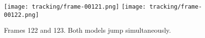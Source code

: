 \begin{figure}[p]
  \centering
  \texttt{[image: tracking/frame-00121.png]}
  \texttt{[image: tracking/frame-00122.png]}
  \caption{Frames 122 and 123. Both models jump simultaneously.}
  \label{fig:rtracking-double-jump}
\end{figure}


\begin{comment}
Mål:
  - Någon form av slutsats huruvida det är rimligt att fortsätta
undersöka detta
    - Identifiera problem och svårigheter
      - Vad är svårare? Försök kvantifiera svårigheter hos problemen
    - Utvärdera prestanda hos algoritmen
      - Tid
      - Resultat

Rapporten:
  - Går det att skala problemet? Undersök.
  - Jämför lösningar

The measures that will be used as fitness of the parameters:
    \begin{description}
        \item[$\int{||\epsilon(t)||_{L^p}}dt$]
            integrating over time the the difference
            with the ground truth (do this for L{1:10} and see if it correlates with
            the p choosed (to see how much it deviates from the ground truth)
        \item[$\int{\Response{x_t}{I_t}{\phi} }dt$] 
            integrating over time the response
            for the choosed hypothesis (to see how the different image transformation
            affects the results, that is if it only follows what it thinks is best
            (phi))
        \item[Subjective] 4 image samples
    \end{description}
And all this are done for all 4 benchmark videos.

<<more shall come>>


\end{comment}